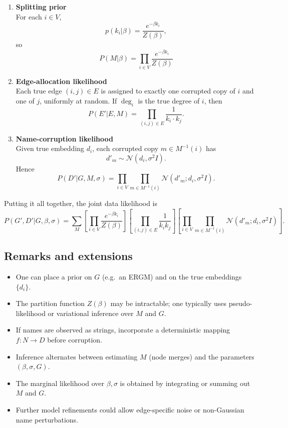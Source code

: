 \documentclass[12pt]{article}
\begin{document}
\begin{enumerate}
\item \textbf{Splitting prior}\\
For each $i \in V$,
$$p(k_i | \beta) = \frac{e^{-\beta k_i}}{Z(\beta)},$$
so
$$P(M | \beta) = \prod_{i \in V} \frac{e^{-\beta k_i}}{Z(\beta)}$$

\item \textbf{Edge-allocation likelihood}\\
Each true edge $(i,j) \in E$ is assigned to exactly one corrupted copy of $i$ and one of $j$, uniformly at random. If $\deg_i$ is the true degree of $i$, then
$$P(E' | E, M) = \prod_{(i,j) \in E} \frac{1}{k_i \cdot k_j}.$$

\item \textbf{Name-corruption likelihood}\\
Given true embedding $d_i$, each corrupted copy $m \in M^{-1}(i)$ has
$$d'_m \sim \mathcal{N}(d_i, \sigma^2 I).$$
Hence
$$P(D' | G, M, \sigma) = \prod_{i \in V} \prod_{m \in M^{-1}(i)} \mathcal{N}(d'_m; d_i, \sigma^2 I).$$
\end{enumerate}

Putting it all together, the joint data likelihood is
$$P(G', D' | G, \beta, \sigma) = \sum_{M} \left[ \prod_{i \in V} \frac{e^{-\beta k_i}}{Z(\beta)} \right] \left[ \prod_{(i,j) \in E} \frac{1}{k_i k_j} \right] \left[ \prod_{i \in V} \prod_{m \in M^{-1}(i)} \mathcal{N}(d'_m; d_i, \sigma^2 I) \right].$$

\subsection{Remarks and extensions}

\begin{itemize}
\item One can place a prior on $G$ (e.g.\ an ERGM) and on the true embeddings $\{d_i\}$.
\item The partition function $Z(\beta)$ may be intractable; one typically uses pseudo-likelihood or variational inference over $M$ and $G$.
\item If names are observed as strings, incorporate a deterministic mapping $f: N \rightarrow D$ before corruption.
\item Inference alternates between estimating $M$ (node merges) and the parameters $(\beta, \sigma, G)$.
\item The marginal likelihood over $\beta, \sigma$ is obtained by integrating or summing out $M$ and $G$.
\item Further model refinements could allow edge-specific noise or non-Gaussian name perturbations.
\end{itemize}
\end{document}
